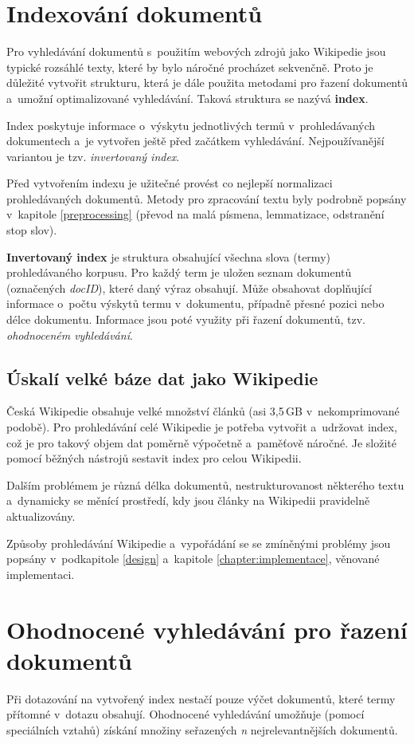 \section{Indexování dokumentů}
Pro vyhledávání dokumentů s~použitím webových zdrojů jako Wikipedie jsou typické rozsáhlé texty, které by bylo náročné procházet sekvenčně. Proto je důležité vytvořit strukturu, která je dále použita metodami pro řazení dokumentů a~umožní optimalizované vyhledávání. Taková struktura se nazývá \textbf{index}.\par
Index poskytuje informace o~výskytu jednotlivých termů v~prohledávaných dokumentech a~je vytvořen ještě před začátkem vyhledávání. Nejpoužívanější variantou je tzv. \emph{invertovaný index}.\par
Před vytvořením indexu je užitečné provést co nejlepší normalizaci prohledávaných dokumentů. Metody pro zpracování textu byly podrobně popsány v~kapitole \ref{preprocessing} (převod na malá písmena, lemmatizace, odstranění stop slov).\par
\textbf{Invertovaný index} je struktura obsahující všechna slova (termy) prohledávaného korpusu. Pro každý term je uložen seznam dokumentů (označených \emph{docID}), které daný výraz obsahují. Může obsahovat doplňující informace o~počtu výskytů termu v~dokumentu, případně přesné pozici nebo délce dokumentu. Informace jsou poté využity při řazení dokumentů, tzv. \emph{ohodnoceném vyhledávání}.

\subsection{Úskalí velké báze dat jako Wikipedie}
Česká Wikipedie obsahuje velké množství článků (asi 3,5\,GB v~nekomprimované podobě). Pro prohledávání celé Wikipedie je potřeba vytvořit a~udržovat index, což je pro takový objem dat poměrně výpočetně a~paměťově náročné. Je složité pomocí běžných nástrojů sestavit index pro celou Wikipedii.\par
Dalším problémem je různá délka dokumentů, nestrukturovanost některého textu a~dynamicky se měnící prostředí, kdy jsou články na Wikipedii pravidelně aktualizovány.\par\enlargethispage{\baselineskip}
Způsoby prohledávání Wikipedie a~vypořádání se se zmíněnými problémy jsou popsány v~podkapitole \ref{design} a~kapitole \ref{chapter:implementace}, věnované implementaci.

\section{Ohodnocené vyhledávání pro řazení dokumentů}
Při dotazování na vytvořený index nestačí pouze výčet dokumentů, které termy přítomné v~dotazu obsahují. Ohodnocené vyhledávání umožňuje (pomocí speciálních vztahů) získání množiny seřazených \emph{n} nejrelevantnějších dokumentů.\par

